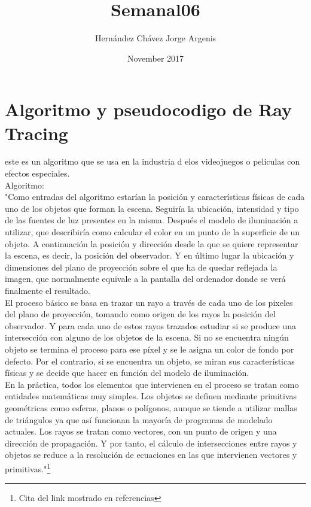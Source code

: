 \documentclass{article}
\title{Semanal06}
\author{Hernández Chávez Jorge Argenis }
\date{November 2017}
\begin{document}
\maketitle

\section{Algoritmo y pseudocodigo de Ray Tracing}
este es un algoritmo que se usa en la industria d elos videojuegos o peliculas con efectos especiales.\\
Algoritmo:\\
"Como entradas del algoritmo estarían la posición y características físicas de cada uno de los objetos que forman la escena. Seguiría la ubicación, intensidad y tipo de las fuentes de luz presentes en la misma. Después el modelo de iluminación a utilizar, que describiría como calcular el color en un punto de la superficie de un objeto. A continuación la posición y dirección desde la que se quiere representar la escena, es decir, la posición del observador. Y en último lugar la ubicación y dimensiones del plano de proyección sobre el que ha de quedar reflejada la imagen, que normalmente equivale a la pantalla del ordenador donde se verá finalmente el resultado.\\

El proceso básico se basa en trazar un rayo a través de cada uno de los pixeles del plano de proyección, tomando como origen de los rayos la posición del observador. Y para cada uno de estos rayos trazados estudiar si se produce una intersección con alguno de los objetos de la escena. Si no se encuentra ningún objeto se termina el proceso para ese píxel y se le asigna un color de fondo por defecto. Por el contrario, si se encuentra un objeto, se miran sus características físicas y se decide que hacer en función del modelo de iluminación.\\

En la práctica, todos los elementos que intervienen en el proceso se tratan como entidades matemáticas muy simples. Los objetos se definen mediante primitivas geométricas como esferas, planos o polígonos, aunque se tiende a utilizar mallas de triángulos ya que así funcionan la mayoría de programas de modelado actuales. Los rayos se tratan como vectores, con un punto de origen y una dirección de propagación. Y por tanto, el cálculo de intersecciones entre rayos y objetos se reduce a la resolución de ecuaciones en las que intervienen vectores y primitivas."\footnote{Cita del link mostrado en referencias}
\end{document}
